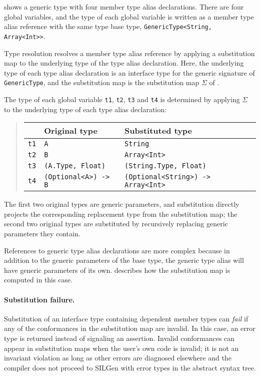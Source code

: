 \documentclass[../generics]{subfiles}
\begin{document}
\begin{example}\label{type alias subst example}  shows a generic type with four member type alias declarations. There are four global variables, and the type of each global variable is written as a member type alias reference with the same type base type, \texttt{GenericType<String, Array<Int>>}. 

Type resolution resolves a member type alias reference by applying a substitution map to the underlying type of the type alias declaration. Here, the underlying type of each type alias declaration is an interface type for the generic signature of \texttt{GenericType}, and the substitution map is the substitution map $\Sigma$ of .

The type of each global variable \texttt{t1}, \texttt{t2}, \texttt{t3} and \texttt{t4} is determined by applying $\Sigma$ to the underlying type of each type alias declaration:
\begin{quote}
\begin{tabular}{lll}
\toprule
&\textbf{Original type}&\textbf{Substituted type}\\
\midrule
\texttt{t1}&\texttt{A}&\texttt{String}\\
\texttt{t2}&\texttt{B}&\texttt{Array<Int>}\\
\texttt{t3}&\texttt{(A.Type, Float)}&\texttt{(String.Type, Float)}\\
\texttt{t4}&\texttt{(Optional<A>) -> B}&\texttt{(Optional<String>) -> Array<Int>}\\
\bottomrule
\end{tabular}
\end{quote}
The first two original types are generic parameters, and substitution directly projects the corresponding replacement type from the substitution map; the second two original types are substituted by recursively replacing generic parameters they contain.
\end{example}

References to generic type alias declarations are more complex because in addition to the generic parameters of the base type, the generic type alias will have generic parameters of its own.  describes how the substitution map is computed in this case.

\paragraph{Substitution failure.}
Substitution of an interface type containing dependent member types can \emph{fail} if any of the conformances in the substitution map are invalid. In this case, an error type is returned instead of signaling an assertion. Invalid conformances can appear in substitution maps when the user's own code is invalid; it is not an invariant violation as long as other errors are diagnosed elsewhere and the compiler does not proceed to SILGen with error types in the abstract syntax tree.
\end{document}

